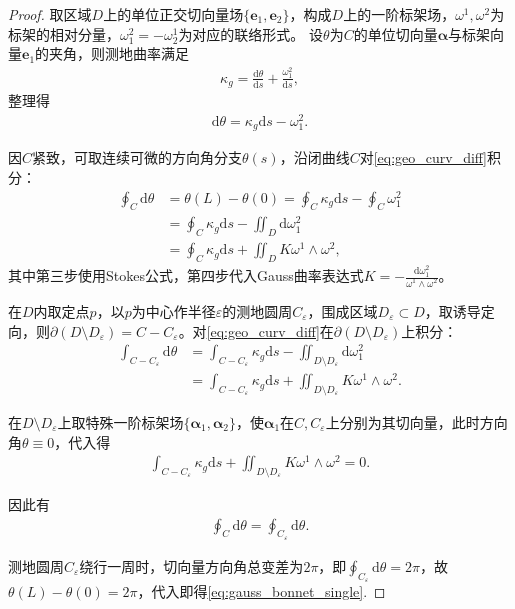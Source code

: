 \documentclass[../../main.tex]{subfiles}%
\begin{document}
\begin{proof}
取区域$D$上的单位正交切向量场$\{\boldsymbol{e}_1,\boldsymbol{e}_2\}$，构成$D$上的一阶标架场，$\omega^1,\omega^2$为标架的相对分量，$\omega_1^2=-\omega_2^1$为对应的联络形式。
设$\theta$为$C$的单位切向量$\boldsymbol{\alpha}$与标架向量$\boldsymbol{e}_1$的夹角，则测地曲率满足
\begin{align*}
\kappa_g = \frac{\mathrm{d}\theta}{\mathrm{d}s} + \frac{\omega_1^2}{\mathrm{d}s},
\end{align*}
整理得
\begin{align}
\mathrm{d}\theta = \kappa_g \mathrm{d}s - \omega_1^2. \label{eq:geo_curv_diff}
\end{align}

因$C$紧致，可取连续可微的方向角分支$\theta(s)$，沿闭曲线$C$对\eqref{eq:geo_curv_diff}积分：
\begin{align*}
\oint_C \mathrm{d}\theta &= \theta(L)-\theta(0) = \oint_C \kappa_g \mathrm{d}s - \oint_C \omega_1^2 \\
&= \oint_C \kappa_g \mathrm{d}s - \iint_D \mathrm{d}\omega_1^2 \\
&= \oint_C \kappa_g \mathrm{d}s + \iint_D K \omega^1 \land \omega^2,
\end{align*}
其中第三步使用Stokes公式，第四步代入Gauss曲率表达式$K=-\frac{\mathrm{d}\omega_1^2}{\omega^1\land\omega^2}$。

在$D$内取定点$p$，以$p$为中心作半径$\varepsilon$的测地圆周$C_\varepsilon$，围成区域$D_\varepsilon\subset D$，取诱导定向，则$\partial(D\setminus D_\varepsilon)=C-C_\varepsilon$。对\eqref{eq:geo_curv_diff}在$\partial(D\setminus D_\varepsilon)$上积分：
\begin{align*}
\int_{C-C_\varepsilon} \mathrm{d}\theta &= \int_{C-C_\varepsilon} \kappa_g \mathrm{d}s - \iint_{D\setminus D_\varepsilon} \mathrm{d}\omega_1^2 \\
&= \int_{C-C_\varepsilon} \kappa_g \mathrm{d}s + \iint_{D\setminus D_\varepsilon} K \omega^1 \land \omega^2.
\end{align*}

在$D\setminus D_\varepsilon$上取特殊一阶标架场$\{\boldsymbol{\alpha}_1,\boldsymbol{\alpha}_2\}$，使$\boldsymbol{\alpha}_1$在$C,C_\varepsilon$上分别为其切向量，此时方向角$\theta\equiv0$，代入得
\begin{align}
\int_{C-C_\varepsilon} \kappa_g \mathrm{d}s + \iint_{D\setminus D_\varepsilon} K \omega^1 \land \omega^2 = 0. \label{eq:zero_int}
\end{align}

因此有
\begin{align}
\oint_C \mathrm{d}\theta = \oint_{C_\varepsilon} \mathrm{d}\theta. \label{eq:angle_eq}
\end{align}

测地圆周$C_\varepsilon$绕行一周时，切向量方向角总变差为$2\pi$，即$\oint_{C_\varepsilon}\mathrm{d}\theta=2\pi$，故$\theta(L)-\theta(0)=2\pi$，代入即得\eqref{eq:gauss_bonnet_single}.
\end{proof}
\end{document}
